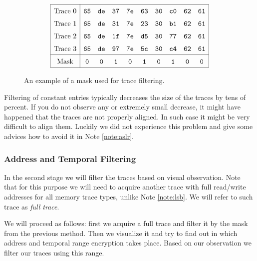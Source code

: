 	\begin{figure}[H]
	\[
	\arraycolsep=.5em\def\arraystretch{1.5}
		\begin{array}{|c|ccccccccc|}
			\hline
			\textnormal{Trace 0} & {\tt 65} & {\tt de} & {\tt 37} & {\tt 7e} & {\tt 63} & {\tt 30} & {\tt c0} & {\tt 62} & {\tt 61} \\
			\textnormal{Trace 1} & {\tt 65} & {\tt de} & {\tt 31} & {\tt 7e} & {\tt 23} & {\tt 30} & {\tt b1} & {\tt 62} & {\tt 61} \\
			\textnormal{Trace 2} & {\tt 65} & {\tt de} & {\tt 1f} & {\tt 7e} & {\tt d5} & {\tt 30} & {\tt 77} & {\tt 62} & {\tt 61} \\
			\textnormal{Trace 3} & {\tt 65} & {\tt de} & {\tt 97} & {\tt 7e} & {\tt 5c} & {\tt 30} & {\tt c4} & {\tt 62} & {\tt 61} \\
			\hline
			\textnormal{Mask}    & {\tt 0}  & {\tt 0}  & {\tt 1}  & {\tt 0}  & {\tt 1}  & {\tt 0}  & {\tt 1}  & {\tt 0}  & {\tt 0} \\
			\hline
		\end{array}
	\]
	\caption{An example of a mask used for trace filtering.}
	\label{fig:constmask}
	\end{figure}
	
	\begin{note}
	\label{note:filter}
		Filtering of constant entries typically decreases the size of the traces by tens of percent. If you do not observe any or extremely small decrease, it might have happened that the traces are not properly aligned. In such case it might be very difficult to align them. Luckily we did not experience this problem and give some advices how to avoid it in Note \ref{note:aslr}.
	\end{note}

\newcommand{\AddrTempFilter}{Address and Temporal Filtering}
\subsubsection{\AddrTempFilter}
	
	In the second stage we will filter the traces based on visual observation. Note that for this purpose we will need to acquire another trace with full read/write addresses for all memory trace types, unlike Note \ref{note:lsb}. We will refer to such trace as {\em full trace}.
	
	We will proceed as follows: first we acquire a full trace and filter it by the mask from the previous method. Then we visualize it and try to find out in which address and temporal range encryption takes place. Based on our observation we filter our traces using this range.
	
